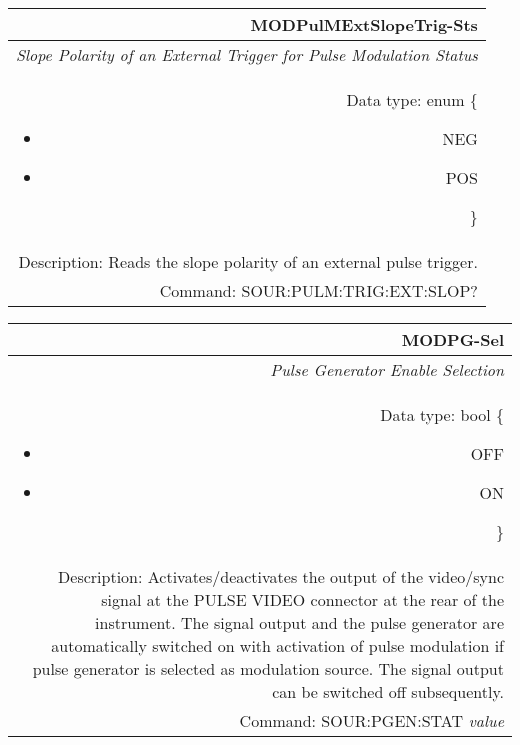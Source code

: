 \documentclass[openany]{article}
\begin{document}
		\begin{tabular}{N}
			\hline
			\bfseries MODPulMExtSlopeTrig-Sts \\ \hline
			\emph{Slope Polarity of an External Trigger for Pulse Modulation Status} \\
			Data type: enum \{\begin{itemize}[noitemsep]
				\small
				\item[] NEG
				\item[] POS
			\end{itemize}\} \\ 
			Description: Reads the slope polarity of an external pulse trigger. \\
			Command: SOUR:PULM:TRIG:EXT:SLOP? \\

		\end{tabular}
%
		\begin{tabular}{N}
			\hline
			\bfseries MODPG-Sel \\ \hline
			\emph{Pulse Generator Enable Selection} \\
			Data type: bool \{\begin{itemize}[noitemsep]
				\small
				\item[] OFF
				\item[] ON
			\end{itemize}\} \\
			Description: Activates/deactivates the output of the video/sync signal at the PULSE VIDEO connector at the rear of the instrument. The signal output and the pulse generator are automatically switched on with activation of pulse modulation if pulse generator is selected as modulation source. The signal output can be switched off subsequently. \\
			Command: SOUR:PGEN:STAT \emph{value} \\

		\end{tabular}
\end{document}
